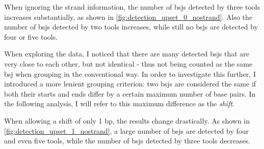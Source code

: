 When ignoring the strand information, the number of \gls{bsj}s detected by
three tools increases substantially, as shown in
\cref{fig:detection_upset_0_nostrand}.
Also the number of \gls{bsj}s detected by two tools increases, while still no
\gls{bsj}s are detected by four or five tools.

When exploring the data, I noticed that there are many detected \gls{bsj}s that
are very close to each other, but not identical - thus not being counted as the
same \gls{bsj} when grouping in the conventional way.
In order to investigate this further, I introduced a more lenient grouping
criterion: two \gls{bsj}s are considered the same if both their starts and ends
differ by a certain maximum number of base pairs.
In the following analysis, I will refer to this maximum difference as the
\textit{shift}.

When allowing a shift of only 1 bp, the results change drastically.
As shown in \cref{fig:detection_upset_1_nostrand}, a large number of \gls{bsj}s
are detected by four and even five tools, while the number of \gls{bsj}s
detected by three tools decreases.

